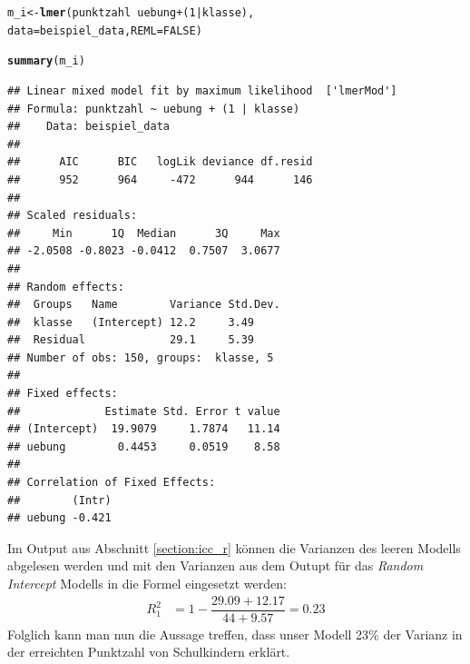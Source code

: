 \documentclass[12pt]{article}\usepackage[]{graphicx}\usepackage[]{color}
\makeatletter
\newcommand{\hlnum}[1]{\textcolor[rgb]{0.686,0.059,0.569}{#1}}%
\newcommand{\hlopt}[1]{\textcolor[rgb]{0,0,0}{#1}}%
\newcommand{\hlstd}[1]{\textcolor[rgb]{0.345,0.345,0.345}{#1}}%
\newcommand{\hlkwb}[1]{\textcolor[rgb]{0.69,0.353,0.396}{#1}}%
\newcommand{\hlkwc}[1]{\textcolor[rgb]{0.333,0.667,0.333}{#1}}%
\newcommand{\hlkwd}[1]{\textcolor[rgb]{0.737,0.353,0.396}{\textbf{#1}}}%
\newenvironment{kframe}{%
 \def\at@end@of@kframe{}%
 \ifinner\ifhmode%
  \def\at@end@of@kframe{\end{minipage}}%
  \begin{minipage}{\columnwidth}%
 \fi\fi%
 \def\FrameCommand##1{\hskip\@totalleftmargin \hskip-\fboxsep
 \colorbox{shadecolor}{##1}\hskip-\fboxsep
     \hskip-\linewidth \hskip-\@totalleftmargin \hskip\columnwidth}%
 \MakeFramed {\advance\hsize-\width
   \@totalleftmargin\z@ \linewidth\hsize
   \@setminipage}}%
 {\par\unskip\endMakeFramed%
 \at@end@of@kframe}
\newenvironment{knitrout}{}{} %
\makeatother
\begin{document}
\singlespacing
\begin{knitrout}
\color{fgcolor}\begin{kframe}
\begin{alltt}
\hlstd{m_i} \hlkwb{<-} \hlkwd{lmer}\hlstd{(punktzahl} \hlopt{~} \hlstd{uebung} \hlopt{+} \hlstd{(}\hlnum{1} \hlopt{|} \hlstd{klasse),}
        \hlkwc{data} \hlstd{= beispiel_data,} \hlkwc{REML} \hlstd{=} \hlnum{FALSE}\hlstd{)}

\hlkwd{summary}\hlstd{(m_i)}
\end{alltt}
\begin{verbatim}
## Linear mixed model fit by maximum likelihood  ['lmerMod']
## Formula: punktzahl ~ uebung + (1 | klasse)
##    Data: beispiel_data
## 
##      AIC      BIC   logLik deviance df.resid 
##      952      964     -472      944      146 
## 
## Scaled residuals: 
##     Min      1Q  Median      3Q     Max 
## -2.0508 -0.8023 -0.0412  0.7507  3.0677 
## 
## Random effects:
##  Groups   Name        Variance Std.Dev.
##  klasse   (Intercept) 12.2     3.49    
##  Residual             29.1     5.39    
## Number of obs: 150, groups:  klasse, 5
## 
## Fixed effects:
##             Estimate Std. Error t value
## (Intercept)  19.9079     1.7874   11.14
## uebung        0.4453     0.0519    8.58
## 
## Correlation of Fixed Effects:
##        (Intr)
## uebung -0.421
\end{verbatim}
\end{kframe}
\end{knitrout}



Im Output aus Abschnitt \ref{section:icc_r} können die Varianzen des leeren Modells abgelesen werden und mit den Varianzen aus dem Outupt für das \textit{Random Intercept} Modells in die Formel eingesetzt werden:
\begin{equation} 
\begin{split}	
 R_{1}^2 & = 1 - \dfrac{29.09 + 12.17}{44 + 9.57} = 0.23
\end{split}	
\end{equation}
Folglich kann man nun die Aussage treffen, dass unser Modell 23\% der Varianz in der erreichten Punktzahl von Schulkindern erklärt.
\end{document}
